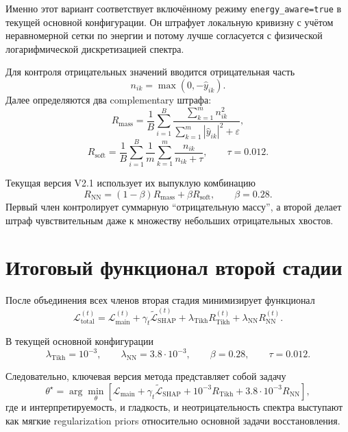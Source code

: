 \documentclass[11pt]{article}
\begin{document}
Именно этот вариант соответствует включённому режиму \texttt{energy\_aware=true} в текущей основной конфигурации. Он штрафует локальную кривизну с учётом неравномерной сетки по энергии и потому лучше согласуется с физической логарифмической дискретизацией спектра.

Для контроля отрицательных значений вводится отрицательная часть
\begin{equation}
n_{ik} = \max(0,-\hat{y}_{ik}).
\end{equation}
Далее определяются два complementary штрафа:
\begin{equation}
R_{\mathrm{mass}} =
\frac{1}{B}\sum_{i=1}^{B}
\frac{\sum_{k=1}^{m} n_{ik}^{2}}{\sum_{k=1}^{m}|\hat{y}_{ik}|^{2}+\varepsilon},
\end{equation}
\begin{equation}
R_{\mathrm{soft}} =
\frac{1}{B}\sum_{i=1}^{B}\frac{1}{m}\sum_{k=1}^{m}
\frac{n_{ik}}{n_{ik}+\tau},
\qquad
\tau = 0.012.
\end{equation}

Текущая версия V2.1 использует их выпуклую комбинацию
\begin{equation}
R_{\mathrm{NN}} = (1-\beta)R_{\mathrm{mass}} + \beta R_{\mathrm{soft}},
\qquad
\beta = 0.28.
\end{equation}
Первый член контролирует суммарную ``отрицательную массу'', а второй делает штраф чувствительным даже к множеству небольших отрицательных хвостов.

\section{Итоговый функционал второй стадии}

После объединения всех членов вторая стадия минимизирует функционал
\begin{equation}
\mathcal{L}_{\mathrm{total}}^{(t)} =
\mathcal{L}_{\mathrm{main}}^{(t)}
+ \gamma_t \widetilde{\mathcal{L}}_{\mathrm{SHAP}}^{(t)}
+ \lambda_{\mathrm{Tikh}} R_{\mathrm{Tikh}}^{(t)}
+ \lambda_{\mathrm{NN}} R_{\mathrm{NN}}^{(t)}.
\end{equation}

В текущей основной конфигурации
\begin{equation}
\lambda_{\mathrm{Tikh}} = 10^{-3},
\qquad
\lambda_{\mathrm{NN}} = 3.8\cdot 10^{-3},
\qquad
\beta = 0.28,
\qquad
\tau = 0.012.
\end{equation}

Следовательно, ключевая версия метода представляет собой задачу
\begin{equation}
\theta^{\star} = \arg\min_{\theta}
\left[
\mathcal{L}_{\mathrm{main}}
+ \gamma_t \widetilde{\mathcal{L}}_{\mathrm{SHAP}}
+ 10^{-3} R_{\mathrm{Tikh}}
+ 3.8\cdot 10^{-3} R_{\mathrm{NN}}
\right],
\end{equation}
где и интерпретируемость, и гладкость, и неотрицательность спектра выступают как мягкие regularization priors относительно основной задачи восстановления.
\end{document}
